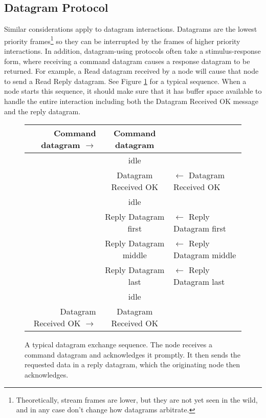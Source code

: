 \documentclass[11pt]{article}
\begin{document}
\cbend

\clearpage
\subsection{Datagram Protocol}

Similar considerations apply to datagram interactions.
Datagrams are the lowest priority
frames\footnote{Theoretically, stream frames are lower, but 
    they are not yet seen in the wild, 
    and in any case don't change how datagrams arbitrate.}
so they can be interrupted by the frames of higher priority 
interactions.  In addition, datagram-using protocols often
take a stimulus-response form, where receiving a command datagram
causes a response datagram to be returned.  For example, a
Read datagram received by a node will cause that node to send a 
Read Reply datagram. See
Figure  \ref{fig:datagram_read}
for a typical sequence.
\cbstart
When a node starts this sequence, it should make sure that it 
has buffer space available to handle the entire interaction
including both the Datagram Received OK message and the reply datagram.
\cbend

\begin{figure}[!hbp]
\begin{center}
\begin{tabular}{ r | c | l}
\hline
Command datagram $\rightarrow$ & Command datagram \\ \hline

    & idle & \\ \hline

    & Datagram Received OK & $\leftarrow$ Datagram Received OK \\ \hline
    
    & idle & \\ \hline

    & Reply Datagram first & $\leftarrow$ Reply Datagram first \\ \hline
    & Reply Datagram middle & $\leftarrow$ Reply Datagram middle \\ \hline
    & Reply Datagram last & $\leftarrow$ Reply Datagram last \\ \hline
    
    & idle & \\ \hline

Datagram Received OK $\rightarrow$ & Datagram Received OK & \\ \hline

\end{tabular}
\end{center}
\caption{A typical datagram exchange sequence.  The node receives
a command datagram and acknowledges it promptly.  It then
sends the requested data in a reply datagram, which the 
originating node then acknowledges.}
\label{fig:datagram_read}
\end{figure}
\end{document}
